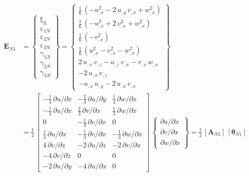 \begin{equation}
\begin{aligned}
\mathbf{E}_{N1} & =  \begin{Bmatrix}
\mathrm \xi_{L} \\
\mathrm \varepsilon_{1N} \\
\mathrm \varepsilon_{2N} \\
\mathrm \varepsilon_{3N} \\
\mathrm \gamma_{1N} \\
\mathrm \gamma_{2N} \\
\mathrm \gamma_{3N} \end{Bmatrix} =
\begin{Bmatrix}
\tfrac{1}{6} \,  \left( -u_{,x}^2 - 2 \, u_{,y} \, v_{,x}  +  w_{,x}^2  \right)\\
\tfrac{1}{6} \,  \left( -u_{,x}^2 + 2 \, v_{,x}^2 +  w_{,x}^2 \right) \\
\tfrac{1}{6} \,  \left( - v_{,x}^2 \right) \\
\tfrac{1}{6} \,  \left( u_{,x}^2 - v_{,x}^2 -  w_{,x}^2  \right) \\ 
2 \, u_{,x} \, v_{,z} - u_{,z} \, v_{,x} - v_{,x} \, w_{,x} \\
- 2 \, u_{,x} \, v_{,z} \\ 
- u_{,x} \, u_{,y} - 2 \, u_{,x} \, v_{,x}\end{Bmatrix} \\
& = \frac{1}{2} \, \begin{bmatrix}
-\tfrac{1}{3} \, \partial u / \partial x &  - \tfrac{2}{3} \, \partial u / \partial y & \tfrac{1}{3} \, \partial w / \partial x  \\
-\tfrac{1}{3} \, \partial u / \partial x &  \tfrac{2}{3} \, \partial v / \partial x & \tfrac{1}{3} \, \partial w / \partial x  \\
0  & -\tfrac{1}{3} \, \partial v / \partial x & 0 \\
\tfrac{1}{3} \, \partial u / \partial x &  - \tfrac{1}{3} \, \partial v / \partial x & - \tfrac{1}{3} \, \partial w / \partial x  \\
4 \, \partial v / \partial z &  - 2 \, \partial u / \partial z & - 2 \,  \partial v / \partial x  \\
- 4 \, \partial v / \partial z &  0 & 0  \\
- 2 \, \partial u / \partial y &  - 4 \, \partial u / \partial x & 0   \end{bmatrix} \, \begin{Bmatrix}
\partial u / \partial x\\
\partial v / \partial x \\
\partial w / \partial x
\end{Bmatrix}
= \tfrac{1}{2} \, [\mathbf{A}_{N1}] \, [\boldsymbol{\theta}_{N1}]
\end{aligned}
\end{equation}

